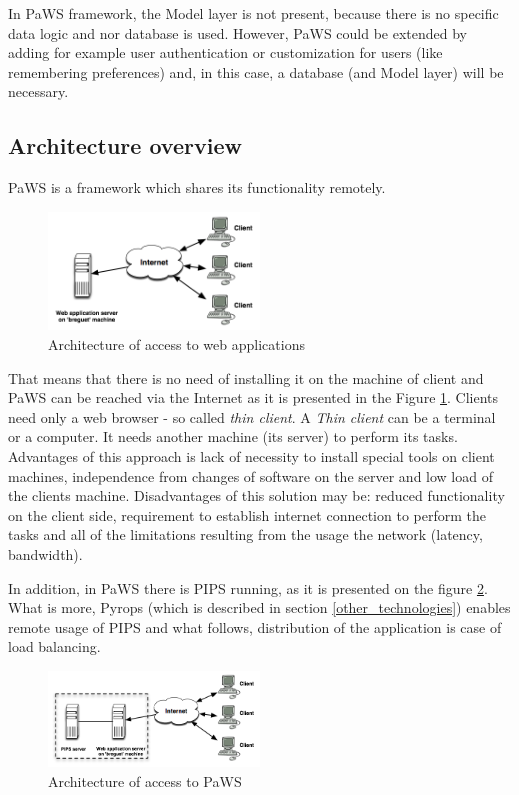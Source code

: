 In PaWS framework, the Model layer is not present, because there is no specific data logic and nor database is used. However, PaWS could be extended by adding for example user authentication or customization for users (like remembering preferences) and, in this case, a database (and Model layer) will be necessary.

\subsection{Architecture overview}

PaWS is a framework which shares its functionality remotely. 
\begin{figure}[h!]
  \centering
  \includegraphics[width=0.5\textwidth]{reportCh2/web_applications}
  \caption{Architecture of access to web applications}
  \label{fig:web_applications}
\end{figure}
That means that there is no need of installing it on the machine of client and PaWS can be reached via the Internet as it is presented in the Figure \ref{fig:web_applications}. Clients need only a web browser - so called \emph{thin client}. A \emph{Thin client} can be a terminal or a computer. It needs another machine (its server) to perform its tasks. Advantages of this approach is lack of necessity to install special tools on client machines, independence from changes of software on the server and low load of the clients machine. Disadvantages of this solution may be: reduced functionality on the client side, requirement to establish internet connection to perform the tasks and all of the limitations resulting from the usage the network (latency, bandwidth).

In addition, in PaWS there is PIPS running, as it is presented on the figure \ref{fig:webapp_paws}. What is more, Pyrops (which is described in section \ref{other_technologies}) enables remote usage of PIPS and what follows, distribution of the application is case of load balancing.


\begin{figure}[h!]
  \centering
  \includegraphics[width=0.5\textwidth]{reportCh2/webapp_paws}
  \caption{Architecture of access to PaWS}
  \label{fig:webapp_paws}
\end{figure}

